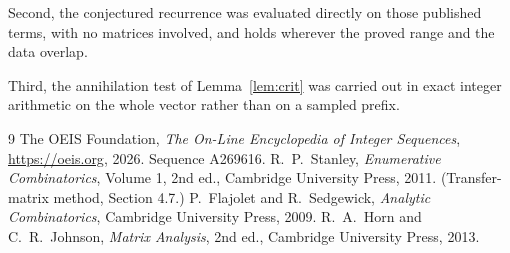 \documentclass[11pt,a4paper]{article}
\theoremstyle{plain}
\theoremstyle{definition}
\begin{document}
Second, the conjectured recurrence was evaluated directly on those published terms, with no
matrices involved, and holds wherever the proved range and the data overlap.

Third, the annihilation test of Lemma~\ref{lem:crit} was carried out in exact integer
arithmetic on the whole vector rather than on a sampled prefix.

\begin{thebibliography}{9}
 The OEIS Foundation, \emph{The On-Line Encyclopedia of Integer
Sequences}, \url{https://oeis.org}, 2026. Sequence A269616.
 R.~P.~Stanley, \emph{Enumerative Combinatorics}, Volume 1, 2nd ed.,
Cambridge University Press, 2011. (Transfer-matrix method, Section 4.7.)
 P.~Flajolet and R.~Sedgewick, \emph{Analytic Combinatorics}, Cambridge
University Press, 2009.
 R.~A.~Horn and C.~R.~Johnson, \emph{Matrix Analysis}, 2nd ed., Cambridge
University Press, 2013.
\end{thebibliography}
\end{document}
